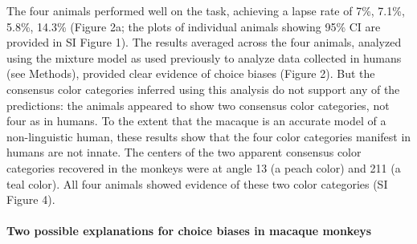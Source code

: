 The four animals performed well on the task, achieving a lapse rate of 7\%, 7.1\%, 5.8\%, 14.3\% (Figure 2a; the plots of individual animals showing 95\% CI are provided in SI Figure 1). The results averaged across the four animals, analyzed using the mixture model as used previously to analyze data collected in humans \citep{bae_why_2015,zhang_discrete_2008} (see Methods), provided clear evidence of choice biases (Figure 2). But the consensus color categories inferred using this analysis do not support any of the predictions: the animals appeared to show two consensus color categories, not four as in humans. To the extent that the macaque is an accurate model of a non-linguistic human, these results show that the four color categories manifest in humans are not innate. The centers of the two apparent consensus color categories recovered in the monkeys were at angle 13 (a peach color) and 211 (a teal color). All four animals showed evidence of these two color categories (SI Figure 4).

\paragraph{Two possible explanations for choice biases in macaque monkeys}

